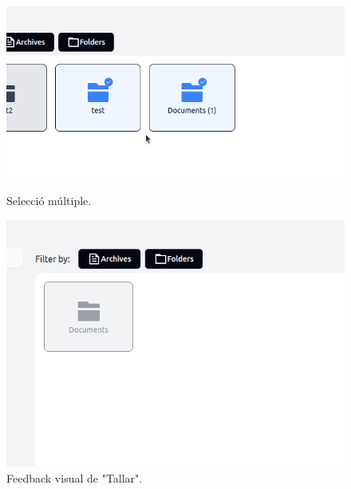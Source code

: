 \begin{figure}[H]
    \centering
    \begin{minipage}{0.32\textwidth}
        \centering
        \includegraphics[width=\linewidth]{Figures/ui-web/selection.png}
        \caption{Selecció múltiple.}
        \label{fig:react-selection-impl}
    \end{minipage}\hfill
    \begin{minipage}{0.32\textwidth}
        \centering
        \includegraphics[width=\linewidth]{Figures/ui-web/cut_file.png}
        \caption{Feedback visual de "Tallar".}
        \label{fig:react-cut-impl}
    \end{minipage}\hfill
    \begin{minipage}{0.32\textwidth}
        \centering

\end{minipage}
\end{figure}
